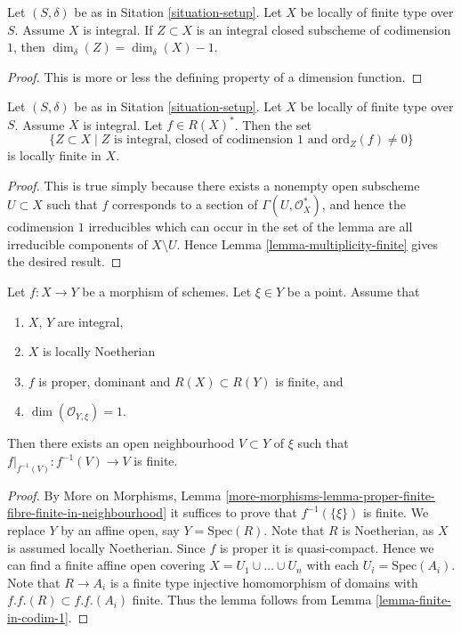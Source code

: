 \begin{lemma}
\label{lemma-divisor-delta-dimension}
Let $(S, \delta)$ be as in Sitation \ref{situation-setup}.
Let $X$ be locally of finite type over $S$. Assume $X$ is
integral. If $Z \subset X$ is an integral closed subscheme
of codimension $1$, then $\dim_\delta(Z) = \dim_\delta(X) - 1$.
\end{lemma}

\begin{proof}
This is more or less the defining property of a dimension function.
\end{proof}

\begin{lemma}
\label{lemma-divisor-locally-finite}
Let $(S, \delta)$ be as in Sitation \ref{situation-setup}.
Let $X$ be locally of finite type over $S$. Assume $X$ is
integral. Let $f \in R(X)^*$. Then the set
$$
\{Z \subset X \mid Z \text{ is integral, closed of codimension }1
\text{ and }\text{ord}_Z(f) \not = 0\}
$$
is locally finite in $X$.
\end{lemma}

\begin{proof}
This is true simply because there exists a nonempty open subscheme
$U \subset X$ such that $f$ corresponds to a section of
$\Gamma(U, \mathcal{O}_X^*)$, and hence the codimension $1$
irreducibles which can occur in the set of the lemma are all
irreducible components of $X \setminus U$.
Hence Lemma \ref{lemma-multiplicity-finite} gives the desired result.
\end{proof}

\begin{lemma}
\label{lemma-finite-in-codimension-one}
Let $f : X \to Y$ be a morphism of schemes.
Let $\xi \in Y$ be a point.
Assume that
\begin{enumerate}
\item $X$, $Y$ are integral,
\item $X$ is locally Noetherian
\item $f$ is proper, dominant and $R(X) \subset R(Y)$ is finite, and
\item $\dim(\mathcal{O}_{Y, \xi}) = 1$.
\end{enumerate}
Then there exists an open neighbourhood $V \subset Y$ of $\xi$
such that $f|_{f^{-1}(V)} : f^{-1}(V) \to V$ is finite.
\end{lemma}

\begin{proof}
By
More on Morphisms,
Lemma \ref{more-morphisms-lemma-proper-finite-fibre-finite-in-neighbourhood}
it suffices to prove that $f^{-1}(\{\xi\})$ is finite.
We replace $Y$ by an affine open, say $Y = \text{Spec}(R)$.
Note that $R$ is Noetherian, as $X$ is assumed locally Noetherian.
Since $f$ is proper it is quasi-compact. Hence we can find a finite
affine open covering $X = U_1 \cup \ldots \cup U_n$ with
each $U_i = \text{Spec}(A_i)$. Note that $R \to A_i$ is a
finite type injective homomorphism of domains with
$f.f.(R) \subset f.f.(A_i)$ finite. Thus the lemma follows
from Lemma \ref{lemma-finite-in-codim-1}.
\end{proof}


